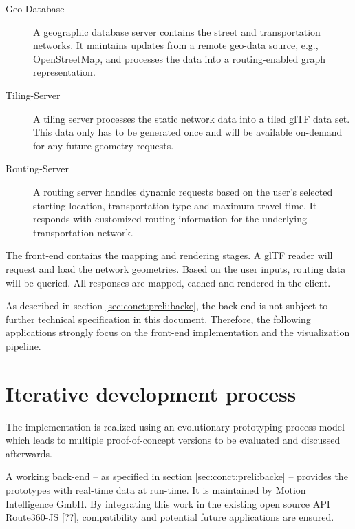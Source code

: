     \begin{description}
      \item[Geo-Database] A geographic database server contains the street and
        transportation networks. It maintains updates from a remote geo-data
        source, e.g., OpenStreetMap, and processes the data into a
        routing-enabled graph representation.
      \item[Tiling-Server] A tiling server processes the static network data
        into a tiled glTF data set. This data only has to be generated once and
        will be available on-demand for any future geometry requests.
      \item[Routing-Server] A routing server handles dynamic requests based on
        the user's selected starting location, transportation type and maximum
        travel time. It responds with customized routing information for the
        underlying transportation network.
    \end{description}

    The front-end contains the mapping and rendering stages. A glTF reader will
    request and load the network geometries. Based on the user inputs, routing
    data will be queried. All responses are mapped, cached and rendered in the
    client.\par

    As described in section \ref{sec:conct:preli:backe}, the back-end is not
    subject to further technical specification in this document. Therefore, the
    following applications strongly focus on the front-end implementation and
    the visualization pipeline.\par

  \section{Iterative development process}
    \label{sec:imple:cycle}
    The implementation is realized using an evolutionary prototyping process
    model which leads to multiple proof-of-concept versions to be evaluated and
    discussed afterwards.\par

    A working back-end -- as specified in section \ref{sec:conct:preli:backe} --
    provides the prototypes with real-time data at run-time. It is
    maintained by Motion Intelligence GmbH. By integrating this work in the
    existing open source API Route360-JS [??], compatibility and potential
    future applications are ensured.\par

